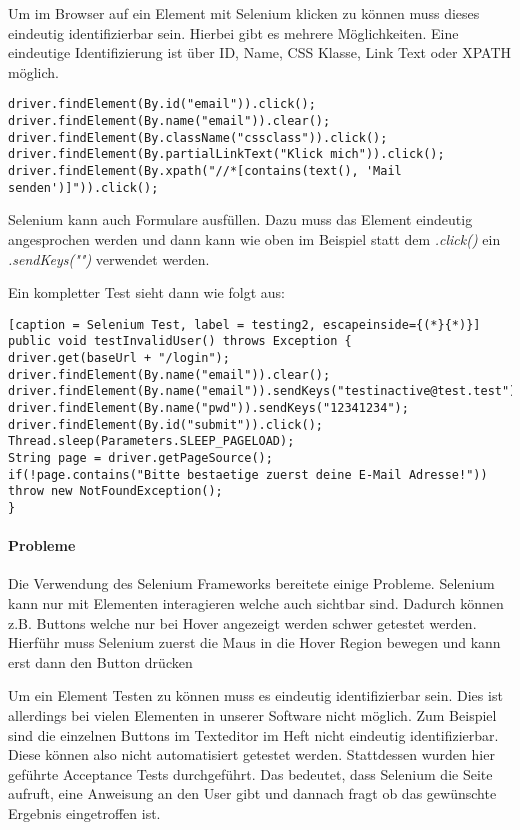 Um im Browser auf ein Element mit Selenium klicken zu können muss dieses eindeutig identifizierbar sein. Hierbei gibt es mehrere Möglichkeiten. Eine eindeutige Identifizierung ist über ID, Name, CSS Klasse, Link Text oder XPATH möglich. 

\begin{lstlisting}[caption = Selenium Element Selektoren, label = testing1]
driver.findElement(By.id("email")).click();
driver.findElement(By.name("email")).clear();
driver.findElement(By.className("cssclass")).click();
driver.findElement(By.partialLinkText("Klick mich")).click();
driver.findElement(By.xpath("//*[contains(text(), 'Mail senden')]")).click();
\end{lstlisting}

Selenium kann auch Formulare ausfüllen. Dazu muss das Element eindeutig angesprochen werden und dann kann wie oben im Beispiel statt dem \textit{.click()} ein \textit{.sendKeys("")} verwendet werden. 

\newpage

Ein kompletter Test sieht dann wie folgt aus:
\begin{lstlisting}[caption = Selenium Test, label = testing2, escapeinside={(*}{*)}]
public void testInvalidUser() throws Exception {
driver.get(baseUrl + "/login");
driver.findElement(By.name("email")).clear();
driver.findElement(By.name("email")).sendKeys("testinactive@test.test");
driver.findElement(By.name("pwd")).sendKeys("12341234");
driver.findElement(By.id("submit")).click();
Thread.sleep(Parameters.SLEEP_PAGELOAD);
String page = driver.getPageSource();
if(!page.contains("Bitte bestaetige zuerst deine E-Mail Adresse!")) throw new NotFoundException();
}
\end{lstlisting}

\paragraph{Probleme}
Die Verwendung des Selenium Frameworks bereitete einige Probleme. Selenium kann nur mit Elementen interagieren welche auch sichtbar sind. Dadurch können z.B. Buttons welche nur bei Hover angezeigt werden schwer getestet werden. Hierführ muss Selenium zuerst die Maus in die Hover Region bewegen und kann erst dann den Button drücken 

Um ein Element Testen zu können muss es eindeutig identifizierbar sein. Dies ist allerdings bei vielen Elementen in unserer Software nicht möglich. Zum Beispiel sind die einzelnen Buttons im Texteditor im Heft nicht eindeutig identifizierbar. Diese können also nicht automatisiert getestet werden. Stattdessen wurden hier geführte Acceptance Tests durchgeführt. Das bedeutet, dass Selenium die Seite aufruft, eine Anweisung an den User gibt und dannach fragt ob das gewünschte Ergebnis eingetroffen ist. 

